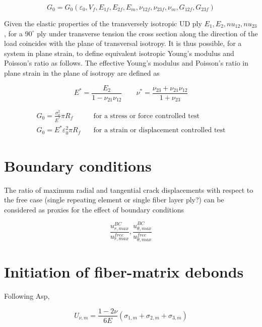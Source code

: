 \documentclass[review]{elsarticle}
\begin{document}
\begin{equation}
G_{0}=G_{0}\left(\varepsilon_{0},V_{f},E_{1f},E_{2f},E_{m},\nu_{12f},\nu_{23f},\nu_{m},G_{12f},G_{23f}\right)
\end{equation}

Given the elastic properties of the transversely isotropic UD ply $E_{1},E_{2},nu_{12},nu_{23}$, for a $90^{\circ}$ ply under transverse tension the cross section along the direction of the load coincides with the plane of transversal isotropy. It is thus possible, for a system in plane strain, to define equivalent isotropic Young's modulus and Poisson's ratio as follows. The effective Young's modulus and Poisson's ratio in plane strain in the plane of isotropy are defined as

\begin{equation}\label{eq:equiplanestraintransiso}
E^{*}=\frac{E_{2}}{1-\nu_{21}\nu_{12}}\qquad\nu^{*}=\frac{\nu_{23}+\nu_{21}\nu_{12}}{1+\nu_{23}}
\end{equation}

\begin{equation}
\begin{split}
G_{0}=\frac{\sigma_{0}^{2}}{E^{*}}\pi R_{f}\quad&\text{for a stress or force controlled test}\\[5pt]
G_{0}=E^{*}\varepsilon_{0}^{2}\pi R_{f}\quad&\text{for a strain or displacement controlled test}
\end{split}
\end{equation}

\section{Boundary conditions}

The ratio of maximum radial and tangential crack displacements with respect to the free case (single repeating element or single fiber layer ply?) can be considered as proxies for the effect of boundary conditions

\begin{equation}
\frac{u^{BC}_{r,max}}{u^{free}_{r,max}},\frac{u^{BC}_{\theta,max}}{u^{free}_{\theta,max}}
\end{equation}

\section{Initiation of fiber-matrix debonds}

Following Asp,

\begin{equation}
U_{\nu,m}=\frac{1-2\nu}{6E}\left(\sigma_{1,m}+\sigma_{2,m}+\sigma_{3,m}\right)
\end{equation}
\end{document}
